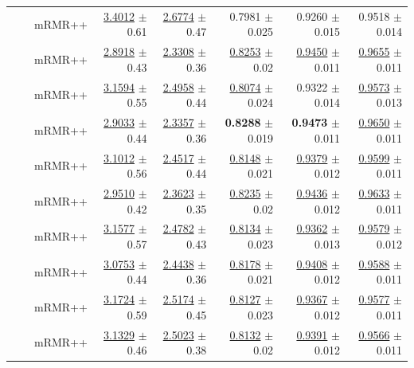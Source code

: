 \begin{longtable}{llp{}rrrrr}
 &  & mRMR++ & \underline{3.4012} {\scriptsize $\pm$ 0.61} & \underline{2.6774} {\scriptsize $\pm$ 0.47} & 0.7981 {\scriptsize $\pm$ 0.025} & 0.9260 {\scriptsize $\pm$ 0.015} & 0.9518 {\scriptsize $\pm$ 0.014} \\
 &  & mRMR++ & \underline{2.8918} {\scriptsize $\pm$ 0.43} & \underline{2.3308} {\scriptsize $\pm$ 0.36} & \underline{0.8253} {\scriptsize $\pm$ 0.02} & \underline{0.9450} {\scriptsize $\pm$ 0.011} & \underline{0.9655} {\scriptsize $\pm$ 0.011} \\
 &  & mRMR++ & \underline{3.1594} {\scriptsize $\pm$ 0.55} & \underline{2.4958} {\scriptsize $\pm$ 0.44} & \underline{0.8074} {\scriptsize $\pm$ 0.024} & 0.9322 {\scriptsize $\pm$ 0.014} & \underline{0.9573} {\scriptsize $\pm$ 0.013} \\
 &  & mRMR++ & \underline{2.9033} {\scriptsize $\pm$ 0.44} & \underline{2.3357} {\scriptsize $\pm$ 0.36} & \textbf{0.8288} {\scriptsize $\pm$ 0.019} & \textbf{0.9473} {\scriptsize $\pm$ 0.011} & \underline{0.9650} {\scriptsize $\pm$ 0.011} \\
 &  & mRMR++ & \underline{3.1012} {\scriptsize $\pm$ 0.56} & \underline{2.4517} {\scriptsize $\pm$ 0.44} & \underline{0.8148} {\scriptsize $\pm$ 0.021} & \underline{0.9379} {\scriptsize $\pm$ 0.012} & \underline{0.9599} {\scriptsize $\pm$ 0.011} \\
 &  & mRMR++ & \underline{2.9510} {\scriptsize $\pm$ 0.42} & \underline{2.3623} {\scriptsize $\pm$ 0.35} & \underline{0.8235} {\scriptsize $\pm$ 0.02} & \underline{0.9436} {\scriptsize $\pm$ 0.012} & \underline{0.9633} {\scriptsize $\pm$ 0.011} \\
 &  & mRMR++ & \underline{3.1577} {\scriptsize $\pm$ 0.57} & \underline{2.4782} {\scriptsize $\pm$ 0.43} & \underline{0.8134} {\scriptsize $\pm$ 0.023} & \underline{0.9362} {\scriptsize $\pm$ 0.013} & \underline{0.9579} {\scriptsize $\pm$ 0.012} \\
 &  & mRMR++ & \underline{3.0753} {\scriptsize $\pm$ 0.44} & \underline{2.4438} {\scriptsize $\pm$ 0.36} & \underline{0.8178} {\scriptsize $\pm$ 0.021} & \underline{0.9408} {\scriptsize $\pm$ 0.012} & \underline{0.9588} {\scriptsize $\pm$ 0.011} \\
 &  & mRMR++ & \underline{3.1724} {\scriptsize $\pm$ 0.59} & \underline{2.5174} {\scriptsize $\pm$ 0.45} & \underline{0.8127} {\scriptsize $\pm$ 0.023} & \underline{0.9367} {\scriptsize $\pm$ 0.012} & \underline{0.9577} {\scriptsize $\pm$ 0.011} \\
 &  & mRMR++ & \underline{3.1329} {\scriptsize $\pm$ 0.46} & \underline{2.5023} {\scriptsize $\pm$ 0.38} & \underline{0.8132} {\scriptsize $\pm$ 0.02} & \underline{0.9391} {\scriptsize $\pm$ 0.012} & \underline{0.9566} {\scriptsize $\pm$ 0.011} \\

\end{longtable}

